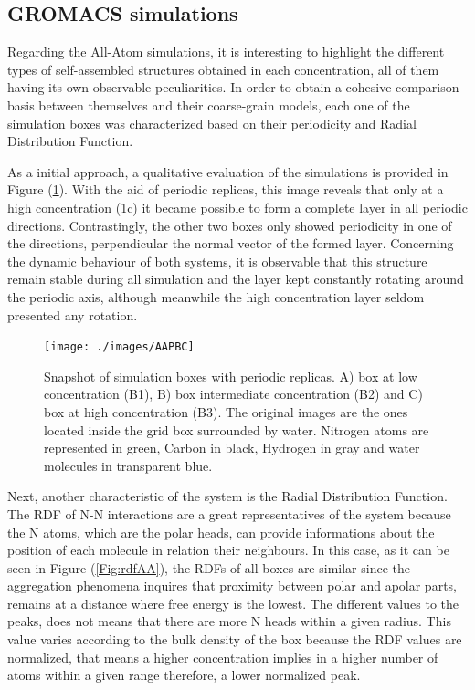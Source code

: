 \documentclass[10pt,a4paper,twoside]{article}
\begin{document}
\subsection{GROMACS simulations}
Regarding the All-Atom simulations, it is interesting to highlight the different types of self-assembled  structures obtained in each concentration, all of them having its own observable peculiarities. In order to obtain a cohesive comparison basis between themselves and their coarse-grain models, each one of the simulation boxes was characterized based on their periodicity and Radial Distribution Function.

As a initial approach, a qualitative evaluation of the simulations is provided in Figure (\ref{Fig:aabox}). With the aid of periodic replicas, this image reveals that only at a high concentration (\ref{Fig:aabox}c) it became possible to form a complete layer in all periodic directions. Contrastingly, the other two boxes only showed periodicity in one of the directions, perpendicular the normal vector of the formed layer. Concerning the dynamic behaviour of both systems, it is observable that this structure remain stable during all simulation and the layer kept constantly rotating around the periodic axis, although meanwhile the high concentration layer seldom presented any rotation.   
\begin{figure}[H]
  \begin{center}
	\texttt{[image: ./images/AAPBC]}
	\caption{Snapshot of simulation boxes with periodic replicas. A) box at low concentration (B1), B) box intermediate concentration (B2) and C) box at high concentration (B3). The original images are the ones located inside the grid box surrounded by water. Nitrogen atoms are represented in green, Carbon in black, Hydrogen in gray and water molecules in transparent blue. }
	\label{Fig:aabox}
  \end{center}
\end{figure}

Next, another characteristic of the system is the Radial Distribution Function. The RDF of N-N interactions are a great representatives of the system because the N atoms, which are the polar heads, can provide informations about the position of each molecule in relation their neighbours. In this case, as it can be seen in Figure (\ref{Fig:rdfAA}), the RDFs of all boxes are similar since the aggregation phenomena inquires that proximity between polar and apolar parts, remains at a distance where free energy is the lowest. The different values to the peaks, does not means that there are more N heads within a given radius. This value varies according to the bulk density of the box because the RDF values are normalized, that means a higher concentration implies in a higher number of atoms within a given range  therefore, a lower normalized peak.  
\end{document}
